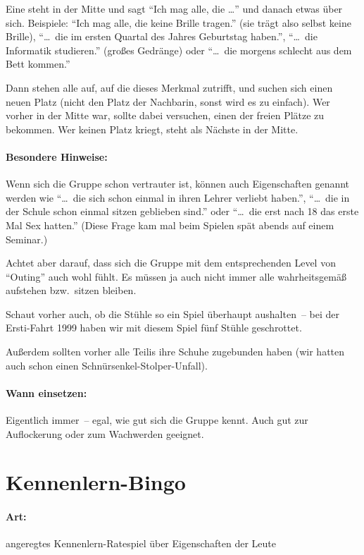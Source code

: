  Eine steht in der Mitte und sagt "`Ich mag alle, die \ldots"' und danach etwas über sich. Beispiele: "`Ich mag alle, die keine Brille tragen."' (sie trägt also selbst keine Brille), "`\ldots\ die im ersten Quartal des Jahres Geburtstag haben."', "`\ldots\ die Informatik studieren."' (großes Gedränge) oder "`\ldots\ die morgens schlecht aus dem Bett kommen."'

Dann stehen alle auf, auf die dieses Merkmal zutrifft, und suchen sich einen neuen Platz (nicht den Platz der Nachbarin, sonst wird es zu einfach). Wer vorher in der Mitte war, sollte dabei versuchen, einen der freien Plätze zu bekommen. Wer keinen Platz kriegt, steht als Nächste in der Mitte.
\paragraph{Besondere Hinweise:} Wenn sich die Gruppe schon vertrauter ist, können auch Eigenschaften genannt werden wie "`\ldots\ die sich schon einmal in ihren Lehrer verliebt haben."',  "`\ldots\ die in der Schule schon einmal sitzen geblieben sind."' oder "`\ldots\ die erst nach 18 das erste Mal Sex hatten."' (Diese Frage kam mal beim Spielen spät abends auf einem Seminar.)

Achtet aber darauf, dass sich die Gruppe mit dem entsprechenden Level von "`Outing"' auch wohl fühlt. Es müssen ja auch nicht immer alle wahrheitsgemäß aufstehen bzw.~sitzen bleiben.

Schaut vorher auch, ob die Stühle so ein Spiel überhaupt aushalten~-- bei der Ersti-Fahrt 1999 haben wir mit diesem Spiel fünf Stühle geschrottet.

Außerdem sollten vorher alle Teilis ihre Schuhe zugebunden haben (wir hatten auch schon einen Schnürsenkel-Stolper-Unfall).

\paragraph{Wann einsetzen:} Eigentlich immer~-- egal, wie gut sich die Gruppe kennt.  Auch gut zur Auflockerung oder zum Wachwerden geeignet.

\section{Kennenlern-Bingo}
\paragraph{Art:} angeregtes Kennenlern-Ratespiel über Eigenschaften der Leute
